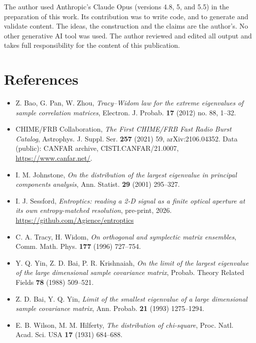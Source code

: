 \documentclass[10pt,letterpaper,twocolumn]{article}
\providecommand{\tightlist}{\setlength{\itemsep}{0pt}\setlength{\parskip}{0pt}}
\begin{document}
The author used Anthropic's Claude Opus (versions 4.8, 5, and 5.5) in the preparation of this work. Its
contribution was to write code, and to generate and validate content. The ideas, the construction
and the claims are the author's. No other generative AI tool was used. The author reviewed and
edited all output and takes full responsibility for the content of this publication.

\section{References}\label{references}

\begin{itemize}
\tightlist
\item
  Z. Bao, G. Pan, W. Zhou, \emph{Tracy--Widom law for the extreme eigenvalues of sample correlation matrices}, Electron. J. Probab. \textbf{17} (2012) no. 88, 1--32.
\item
  CHIME/FRB Collaboration, \emph{The First CHIME/FRB Fast Radio Burst Catalog}, Astrophys. J. Suppl. Ser. \textbf{257} (2021) 59, arXiv:2106.04352. Data (public): CANFAR archive, CISTI.CANFAR/21.0007, \url{https://www.canfar.net/}.
\item
  I. M. Johnstone, \emph{On the distribution of the largest eigenvalue in principal components analysis}, Ann. Statist. \textbf{29} (2001) 295--327.
\item
  I. J. Sessford, \emph{Entroptics: reading a 2-D signal as a finite optical aperture at its own entropy-matched resolution}, pre-print, 2026. \href{https://github.com/Agience/entroptics}{https:\allowbreak{}/\allowbreak{}/\allowbreak{}github.\allowbreak{}com/\allowbreak{}Agience/\allowbreak{}entropti\allowbreak{}cs}
\item
  C. A. Tracy, H. Widom, \emph{On orthogonal and symplectic matrix ensembles}, Comm. Math. Phys. \textbf{177} (1996) 727--754.
\item
  Y. Q. Yin, Z. D. Bai, P. R. Krishnaiah, \emph{On the limit of the largest eigenvalue of the large dimensional sample covariance matrix}, Probab. Theory Related Fields \textbf{78} (1988) 509--521.
\item
  Z. D. Bai, Y. Q. Yin, \emph{Limit of the smallest eigenvalue of a large dimensional sample covariance matrix}, Ann. Probab. \textbf{21} (1993) 1275--1294.
\item
  E. B. Wilson, M. M. Hilferty, \emph{The distribution of chi-square}, Proc. Natl. Acad. Sci. USA \textbf{17} (1931) 684--688.
\end{itemize}
\end{document}
